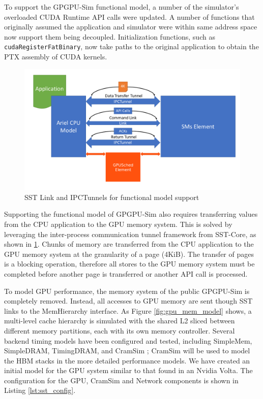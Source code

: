 To support the GPGPU-Sim functional model, a number of the simulator's overloaded
CUDA Runtime API calls were updated. A number of functions that originally assumed
the application and simulator were within same address space now support them being
decoupled. Initialization functions, such as \texttt{\textunderscore \textunderscore
cudaRegisterFatBinary}, now take paths to the original application to obtain the PTX
assembly of CUDA kernels.


   \begin{figure}[!htb]
      \centering
      \setlength{\abovecaptionskip}{6pt plus 1pt minus 1pt}
      \includegraphics[width=.90\textwidth,keepaspectratio]{figures/transfer_flow.PNG}
      \captionsetup{width=.75\textwidth}
      \caption{SST Link and IPCTunnels for functional model support}
      \label{fig:gpu_transfer_model}
   \end{figure}


Supporting the functional model of GPGPU-Sim also requires transferring values
from the CPU application to the GPU memory system. This is solved by leveraging
the inter-process communication tunnel framework from SST-Core, as shown in
\ref{fig:gpu_transfer_model}. Chunks of memory are transferred from the CPU
application to the GPU memory system at the granularity of a page (4KiB). The
transfer of pages is a blocking operation, therefore all stores to the GPU
memory system must be completed before another page is transferred or another
API call is processed.

To model GPU performance, the memory system of the public GPGPU-Sim is
completely removed. Instead, all accesses to GPU memory are sent though SST
links to the MemHierarchy interface. As Figure \ref{fig:gpu_mem_model} shows, a
multi-level cache hierarchy is simulated with the shared L2 sliced between
different memory partitions, each with its own memory controller. Several
backend timing models have been configured and tested, including SimpleMem,
SimpleDRAM, TimingDRAM, and CramSim \cite{healy2017}; CramSim will be used to
model the HBM stacks in the more detailed performance models. We have created an
initial model for the GPU system similar to that found in an Nvidia Volta. The
configuration for the GPU, CramSim and Network components is shown in Listing
\ref{lst:sst_config}.


